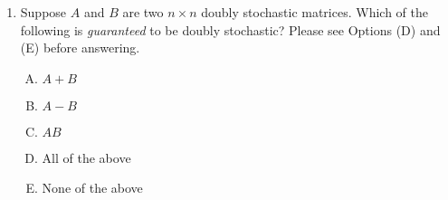 \documentclass[10pt]{amsart}
\begin{document}
\begin{enumerate}
  \begin{enumerate}[(A)]
  \item $A + B$
  \item $A - B$
  \item $AB$
  \item All of the above
  \item None of the above
  \end{enumerate}

  {\em Answer}: Option (C)

  {\em Explanation}: Suppose we are trying to compute the $(ik)^{th}$
  entry of $AB$. This is the sum:

  $$\sum_{j=1}^n a_{ij}b_{jk}$$

  We now want to sum up all such entries in the $k^{th}$ column of
  $AB$. Thus, the sum is:

  $$\sum_{i=1}^n \sum_{j=1}^n a_{ij}b_{jk}$$

  The sum can be rearranged as:

  $$\sum_{j=1}^n \left(b_{jk} \sum_{i=1}^n a_{ij}\right)$$

  Each of the inner sums is $1$, on account of being a row sum of
  $A$. Thus, the sum simplifies to:

  $$\sum_{j=1}^n b_{jk}$$

  This is $1$, on account of being a column sum of $B$.

  Thus, every column sum of $AB$ is $1$. Further, because of the way we
  define matrix multiplication, all the entries of $AB$ are
  nonnegative. Combined with the condition on sums, we get that all
  entries are in $[0,1]$ with all row sums $1$. Thus, the matrix $AB$
  is column-stochastic.

  As for Options (A) and (B), note that for Option (A), the column sums
  will become $2$ and for Option (B), the column sums will become $0$.

  {\em Performance review}: 13 out of 22 got this. 8 chose (E), 1 chose (A).

  {\em Historical note (last time)}: $12$ out of $24$ got this. $11$ chose (E),
  $1$ chose (A).

\item Suppose $A$ and $B$ are two $n \times n$ doubly stochastic
  matrices. Which of the following is {\em guaranteed} to be
  doubly stochastic? Please see Options (D) and (E) before answering.

  \begin{enumerate}[(A)]
  \item $A + B$
  \item $A - B$
  \item $AB$
  \item All of the above
  \item None of the above
  \end{enumerate}


\end{enumerate}
\end{document}
